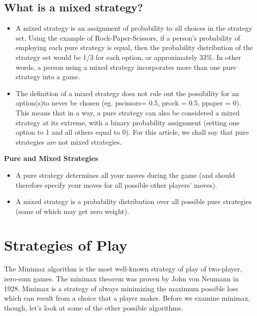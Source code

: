\documentclass[a4paper,12pt]{article}
\begin{document}

\subsection{What is a mixed strategy?}
\begin{itemize}
\item A mixed strategy is an assignment of probability to all choices in the strategy set. Using the example of Rock-Paper-Scissors, if a person’s probability of employing each pure strategy is equal, then the probability distribution of the strategy set would be 1/3 for each option, or approximately 33\%. In other words, a person using a mixed strategy incorporates more than one pure strategy into a game.

\item The definition of a mixed strategy does not rule out the possibility for an option(s)to never be chosen (eg. pscissors= 0.5, prock = 0.5, ppaper = 0). This means that in a way, a pure strategy can also be considered a mixed strategy at its extreme, with a binary probability assignment (setting one option to 1 and all others equal to 0). For this article, we shall say that pure strategies are not mixed strategies.
\end{itemize}

\begin{framed}
\noindent \textbf{Pure and Mixed Strategies}


\begin{itemize}
\item A pure strategy determines all your moves during the game (and should therefore specify your moves for all possible other players' moves). 
\item A mixed strategy is a probability distribution over all possible pure strategies (some of which may get zero weight).
\end{itemize}
\end{framed}





\section{Strategies of Play}
The Minimax algorithm is the most well-known strategy of play of two-player, zero-sum games. The minimax theorem was proven by John von Neumann in 1928. Minimax is a strategy of always minimizing the maximum possible loss which can result from a choice that a player makes. Before we examine minimax, though, let's look at some of the other possible algorithms.
\end{document}
